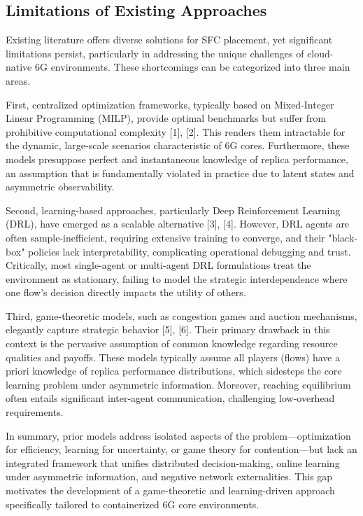\documentclass[journal]{IEEEtran}
\theoremstyle{plain}
\theoremstyle{definition}
\theoremstyle{remark}
\begin{document}
\subsection{Limitations of Existing Approaches}
\label{sec:intro_limitations}

Existing literature offers diverse solutions for SFC placement, yet significant limitations persist, particularly in addressing the unique challenges of cloud-native 6G environments. These shortcomings can be categorized into three main areas.

First, centralized optimization frameworks, typically based on Mixed-Integer Linear Programming (MILP), provide optimal benchmarks but suffer from prohibitive computational complexity [1], [2]. This renders them intractable for the dynamic, large-scale scenarios characteristic of 6G cores. Furthermore, these models presuppose perfect and instantaneous knowledge of replica performance, an assumption that is fundamentally violated in practice due to latent states and asymmetric observability.

Second, learning-based approaches, particularly Deep Reinforcement Learning (DRL), have emerged as a scalable alternative [3], [4]. However, DRL agents are often sample-inefficient, requiring extensive training to converge, and their "black-box" policies lack interpretability, complicating operational debugging and trust. Critically, most single-agent or multi-agent DRL formulations treat the environment as stationary, failing to model the strategic interdependence where one flow's decision directly impacts the utility of others.

Third, game-theoretic models, such as congestion games and auction mechanisms, elegantly capture strategic behavior [5], [6]. Their primary drawback in this context is the pervasive assumption of common knowledge regarding resource qualities and payoffs. These models typically assume all players (flows) have a priori knowledge of replica performance distributions, which sidesteps the core learning problem under asymmetric information. Moreover, reaching equilibrium often entails significant inter-agent communication, challenging low-overhead requirements.

In summary, prior models address isolated aspects of the problem—optimization for efficiency, learning for uncertainty, or game theory for contention—but lack an integrated framework that unifies distributed decision-making, online learning under asymmetric information, and negative network externalities. This gap motivates the development of a game-theoretic and learning-driven approach specifically tailored to containerized 6G core environments.
\end{document}
